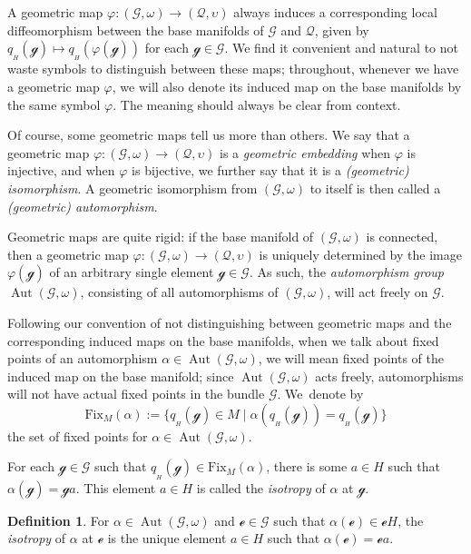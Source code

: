 \documentclass[10pt,a4paper]{amsart}
\numberwithin{equation}{section}
\theoremstyle{definition}
\newtheorem{Definition}[Theorem]{Definition}
\DeclareMathOperator{\Aut}{\mathrm{Aut}}
\begin{document}
A geometric map $\varphi\colon (\mathscr{G},\omega)\to (\mathscr{Q},\upsilon)$ always induces a corresponding local diffeomorphism between the base manifolds of $\mathscr{G}$ and $\mathscr{Q}$, given by $q_{{}_H}(\mathscr{g})\mapsto q_{{}_H}(\varphi(\mathscr{g}))$ for each $\mathscr{g}\in\mathscr{G}$. We find it convenient and natural to not waste symbols to distinguish between these maps; throughout, whenever we have a geometric map $\varphi$, we will also denote its induced map on the base manifolds by the same symbol $\varphi$. The meaning should always be clear from context.

Of course, some geometric maps tell us more than others. We say that a geometric map $\varphi\colon (\mathscr{G},\omega)\to (\mathscr{Q},\upsilon)$ is a \emph{geometric embedding} when $\varphi$ is injective, and when $\varphi$ is bijective, we further say that it is a \emph{(geometric) isomorphism}. A geometric isomorphism from $(\mathscr{G},\omega)$ to itself is then called a \emph{(geometric) automorphism}.

Geometric maps are quite rigid: if the base manifold of $(\mathscr{G},\omega)$ is connected, then a geometric map $\varphi\colon (\mathscr{G},\omega)\to(\mathscr{Q},\upsilon)$ is uniquely determined by the image $\varphi(\mathscr{g})$ of an arbitrary single element $\mathscr{g}\in\mathscr{G}$. As such, the \emph{automorphism group} $\Aut(\mathscr{G},\omega)$, consisting of all automorphisms of $(\mathscr{G},\omega)$, will act freely on $\mathscr{G}$.

Following our convention of not distinguishing between geometric maps and the corresponding induced maps on the base manifolds, when we talk about fixed points of an automorphism $\alpha\in\Aut(\mathscr{G},\omega)$, we will mean fixed points of the induced map on the base manifold; since $\Aut(\mathscr{G},\omega)$ acts freely, automorphisms will not have actual fixed points in the bundle $\mathscr{G}$. We~denote by \[\mathrm{Fix}_M(\alpha):=\{q_{{}_H}(\mathscr{g})\in M \mid \alpha(q_{{}_H}(\mathscr{g}))=q_{{}_H}(\mathscr{g})\}\] the set of fixed points for $\alpha\in\Aut(\mathscr{G},\omega)$.

For each $\mathscr{g}\in\mathscr{G}$ such that $q_{{}_H}(\mathscr{g})\in\mathrm{Fix}_M(\alpha)$, there is some $a\in H$ such that $\alpha(\mathscr{g})=\mathscr{g}a$. This element $a\in H$ is called the \emph{isotropy} of $\alpha$ at $\mathscr{g}$.

\begin{Definition}For $\alpha\in\Aut(\mathscr{G},\omega)$ and $\mathscr{e}\in\mathscr{G}$ such that $\alpha(\mathscr{e})\in\mathscr{e}H$, the \emph{isotropy} of $\alpha$ at $\mathscr{e}$ is the unique element $a\in H$ such that $\alpha(\mathscr{e})=\mathscr{e}a$.\end{Definition}
\end{document}
